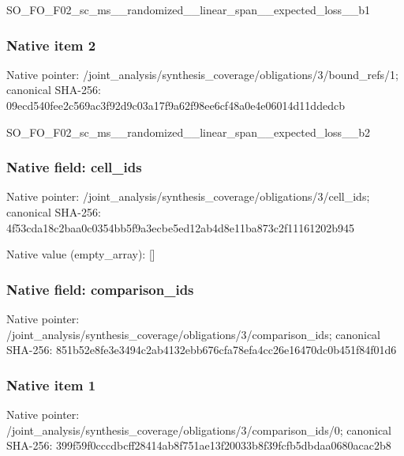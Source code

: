 \documentclass[10pt,a4paper]{article}
\begin{document}
\begingroup\raggedright\sloppy SO\_\allowbreak{}FO\_\allowbreak{}F02\_\allowbreak{}sc\_\allowbreak{}ms\_\allowbreak{}\_\allowbreak{}randomized\_\allowbreak{}\_\allowbreak{}linear\_\allowbreak{}span\_\allowbreak{}\_\allowbreak{}expected\_\allowbreak{}loss\_\allowbreak{}\_\allowbreak{}b1\par\endgroup

\subsubsection{Native item 2}
Native pointer: /joint\_\allowbreak{}analysis/synthesis\_\allowbreak{}coverage/obligations/3/bound\_\allowbreak{}refs/1; canonical SHA-256: 09ecd540fee2c569ac3f92d9c03a17f9a62f98ee6cf48a0e4e06014d11ddedcb

\begingroup\raggedright\sloppy SO\_\allowbreak{}FO\_\allowbreak{}F02\_\allowbreak{}sc\_\allowbreak{}ms\_\allowbreak{}\_\allowbreak{}randomized\_\allowbreak{}\_\allowbreak{}linear\_\allowbreak{}span\_\allowbreak{}\_\allowbreak{}expected\_\allowbreak{}loss\_\allowbreak{}\_\allowbreak{}b2\par\endgroup

\subsubsection{Native field: cell\_\allowbreak{}ids}
Native pointer: /joint\_\allowbreak{}analysis/synthesis\_\allowbreak{}coverage/obligations/3/cell\_\allowbreak{}ids; canonical SHA-256: 4f53cda18c2baa0c0354bb5f9a3ecbe5ed12ab4d8e11ba873c2f11161202b945

Native value (empty\_\allowbreak{}array): []

\subsubsection{Native field: comparison\_\allowbreak{}ids}
Native pointer: /joint\_\allowbreak{}analysis/synthesis\_\allowbreak{}coverage/obligations/3/comparison\_\allowbreak{}ids; canonical SHA-256: 851b52e8fe3e3494c2ab4132ebb676cfa78efa4cc26e16470dc0b451f84f01d6

\subsubsection{Native item 1}
Native pointer: /joint\_\allowbreak{}analysis/synthesis\_\allowbreak{}coverage/obligations/3/comparison\_\allowbreak{}ids/0; canonical SHA-256: 399f59f0cccdbcff28414ab8f751ae13f20033b8f39fcfb5dbdaa0680acac2b8
\end{document}
